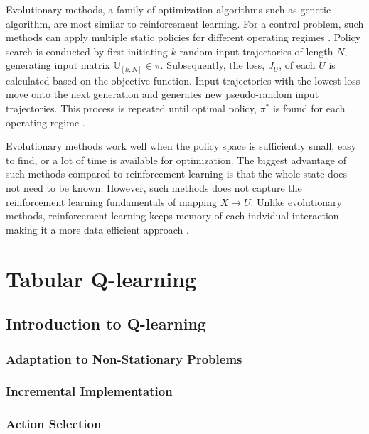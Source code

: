 Evolutionary methods, a family of optimization algorithms such as genetic algorithm, are most similar to reinforcement learning.  For a control problem, such methods can apply multiple static policies for different operating regimes \cite{sutton}.  Policy search is conducted by first initiating $k$ random input trajectories of length $N$, generating input matrix $\mathbb{U}_{[k, N]} \in \pi$.  Subsequently, the loss, $J_U$, of each $U$ is calculated based on the objective function.  Input trajectories with the lowest loss move onto the next generation and generates new pseudo-random input trajectories.  This process is repeated until optimal policy, $\pi^*$ is found for each operating regime \cite{ga_for_control}.

Evolutionary methods work well when the policy space is sufficiently small, easy to find, or a lot of time is available for optimization.  The biggest advantage of such methods compared to reinforcement learning is that the whole state does not need to be known.  However, such methods does not capture the reinforcement learning fundamentals of mapping $X \rightarrow U$.  Unlike evolutionary methods, reinforcement learning keeps memory of each indvidual interaction making it a more data efficient approach \cite{sutton}.




\section{Tabular Q-learning}
\subsection{Introduction to Q-learning}
\subsubsection{Adaptation to Non-Stationary Problems}
\subsubsection{Incremental Implementation}
\subsubsection{Action Selection}
